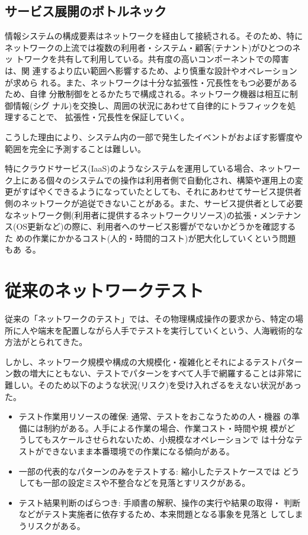  \subsection{サービス展開のボトルネック}
  \label{sec:bottleneck}

情報システムの構成要素はネットワークを経由して接続される。そのため、特に
ネットワークの上流では複数の利用者・システム・顧客(テナント)がひとつのネッ
トワークを共有して利用している。共有度の高いコンポーネントでの障害は、関
連するより広い範囲へ影響するため、より慎重な設計やオペレーションが求めら
れる。また、ネットワークは十分な拡張性・冗長性をもつ必要があるため、自律
分散制御をとるかたちで構成される。ネットワーク機器は相互に制御情報(シグ
ナル)を交換し、周囲の状況にあわせて自律的にトラフィックを処理することで、
拡張性・冗長性を保証していく。

こうした理由により、システム内の一部で発生したイベントがおよぼす影響度や
範囲を完全に予測することは難しい。

特にクラウドサービス(IaaS)のようなシステムを運用している場合、ネットワー
ク上にある個々のシステムでの操作は利用者側で自動化され、構築や運用上の変
更がすばやくできるようになっていたとしても、それにあわせてサービス提供者
側のネットワークが追従できないことがある。また、サービス提供者として必要
なネットワーク側(利用者に提供するネットワークリソース)の拡張・メンテナン
ス(OS更新など)の際に、利用者へのサービス影響がでないかどうかを確認するた
めの作業にかかるコスト(人的・時間的コスト)が肥大化していくという問題もあ
る。

  \section{従来のネットワークテスト}


従来の「ネットワークのテスト」では、その物理構成操作の要求から、特定の場
所に人や端末を配置しながら人手でテストを実行していくという、人海戦術的な
方法がとられてきた。

しかし、ネットワーク規模や構成の大規模化・複雑化とそれによるテストパター
ン数の増大にともない、テストでパターンをすべて人手で網羅することは非常に
難しい。そのため以下のような状況(リスク)を受け入れざるをえない状況があった。
\begin{itemize}
 \item テスト作業用リソースの確保: 通常、テストをおこなうための人・機器
       の準備には制約がある。人手による作業の場合、作業コスト・時間や規
       模がどうしてもスケールさせられないため、小規模なオペレーションで
       は十分なテストができないまま本番環境での作業になる傾向がある。
 \item 一部の代表的なパターンのみをテストする: 縮小したテストケースでは
       どうしても一部の設定ミスや不整合などを見落とすリスクがある。
 \item テスト結果判断のばらつき: 手順書の解釈、操作の実行や結果の取得・
       判断などがテスト実施者に依存するため、本来問題となる事象を見落と
       してしまうリスクがある。
\end{itemize}

